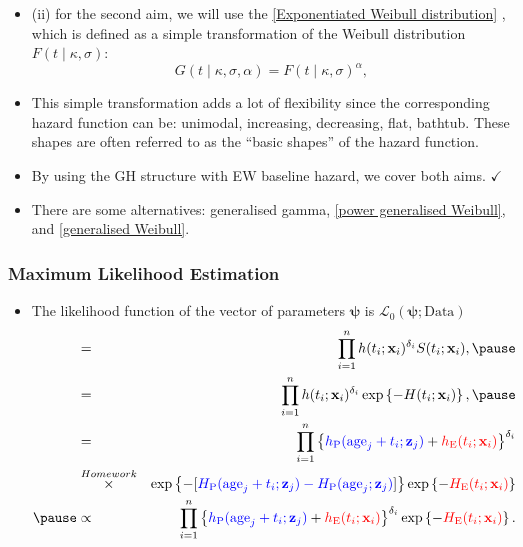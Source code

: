 \documentclass[10pt,handout,compress]{beamer}
\newcommand{\bx}{{\bf x}}
\newcommand{\bz}{{\bf z}}
\begin{document}
\begin{frame}
\begin{itemize}
\item (ii) for the second aim, we will use the \href{https://rpubs.com/FJRubio/EWD}{[Exponentiated Weibull distribution]} \citep{M96}, which is defined as a simple transformation of the Weibull distribution $F(t \mid \kappa, \sigma)$:
$$G(t \mid \kappa, \sigma,\alpha) = F(t \mid \kappa, \sigma)^{\alpha},$$ \pause

\item This simple transformation adds a lot of flexibility since the corresponding hazard function can be: unimodal, increasing, decreasing, flat, bathtub. These shapes are often referred to as the ``basic shapes'' of the hazard function. \pause
\item By using the GH structure with EW baseline hazard, we cover both aims. $\checkmark$ \pause
\item There are some alternatives: generalised gamma, \href{https://rpubs.com/FJRubio/PGW}{[power generalised Weibull]}, and \href{https://rpubs.com/FJRubio/GWD}{[generalised Weibull]}.
\end{itemize}
\end{frame}

\begin{frame}
\frametitle{Maximum Likelihood Estimation}
\begin{itemize}
\item The likelihood function of the vector of parameters $\bm{\psi}$ is ${\mathcal L}_0(\bm{\psi};\text{Data})$
\begin{eqnarray*}
 &=& \prod_{i=1}^n h(t_i;\bx_i)^{\delta_i}S(t_i;\bx_i), \pause \\
  &=& \prod_{i=1}^n h(t_i;\bx_i)^{\delta_i}\exp\left\{-H(t_i;\bx_i)\right\}, \pause \\
&=& \prod_{i=1}^n \left\{ \textcolor{blue}{h_{\text{P}}(\text{age}_j+t_i;\bz_j)}+ \textcolor{red}{h_{\text{E}}(t_i;\bx_i)} \right\}^{\delta_i}\\
&\stackrel{Homework}{\times}& \exp\left\{- [\textcolor{blue}{H_{\text{P}}(\text{age}_j+t_i;\bz_j) -H_{\text{P}}(\text{age}_j;\bz_j)}]\right\} \exp\left\{- \textcolor{red}{H_{\text{E}}(t_i;\bx_i)}\right\}\\ \pause
&\propto& \prod_{i=1}^n \left\{ \textcolor{blue}{h_{\text{P}}(\text{age}_j+t_i;\bz_j)}+ \textcolor{red}{h_{\text{E}}(t_i;\bx_i)} \right\}^{\delta_i} \exp\left\{- \textcolor{red}{H_{\text{E}}(t_i;\bx_i)}\right\}.
\end{eqnarray*}
\end{itemize}
\end{frame}
\end{document}
